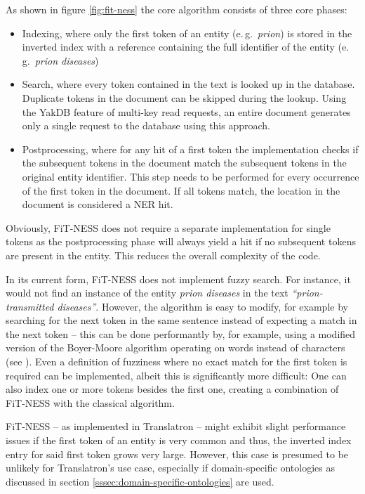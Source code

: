 \documentclass[a4paper, 12pt, twoside, reqn]{report}
\numberwithin{figure}{chapter}
\newtheorem[L]{boxedDefinition}{Definition}
\newtheorem[L]{boxedExample}{Example}
\newcommand{\eg}{e.\,g.\ }
\newcommand{\itquote}[1]{\textit{{``}#1{''}}}
\begin{document}
As shown in figure \ref{fig:fit-ness} the core algorithm consists of three core phases:
\begin{itemize}
 \item Indexing, where only the first token of an entity (\eg \textit{prion}) is stored in the inverted index with a reference containing the full identifier of the entity (\eg \textit{prion diseases})
 
 \item Search, where every token contained in the text is looked up in the database. Duplicate tokens in the document can be skipped during the lookup. Using the YakDB feature of multi-key read requests, an entire document generates only a single request to the database using this approach.
 
 \item Postprocessing, where for any hit of a first token the implementation checks if the subsequent tokens in the document match the subsequent tokens in the original entity identifier. This step needs to be performed for every occurrence of the first token in the document. If all tokens match, the location in the document is considered a NER hit.
\end{itemize}

Obviously, FiT-NESS does not require a separate implementation for single tokens as the postprocessing phase will always yield a hit if no subsequent tokens are present in the entity. This reduces the overall complexity of the code.

In its current form, FiT-NESS does not implement fuzzy search. For instance, it would not find an instance of the entity \textit{prion diseases} in the text \itquote{prion-transmitted diseases}. However, the algorithm is easy to modify, for example by searching for the next token in the same sentence instead of expecting a match in the next token -- this can be done performantly by, for example, using a modified version of the Boyer-Moore algorithm operating on words instead of characters (see \cite{boyer1977fast}). Even a definition of fuzziness where no exact match for the first token is required can be implemented, albeit this is significantly more difficult: One can also index one or more tokens besides the first one, creating a combination of FiT-NESS with the classical algorithm.

FiT-NESS -- as implemented in Translatron -- might exhibit slight performance issues if the first token of an entity is very common and thus, the inverted index entry for said first token grows very large. However, this case is presumed to be unlikely for Translatron's use case, especially if domain-specific ontologies as discussed in section \ref{sssec:domain-specific-ontologies} are used.
\end{document}
